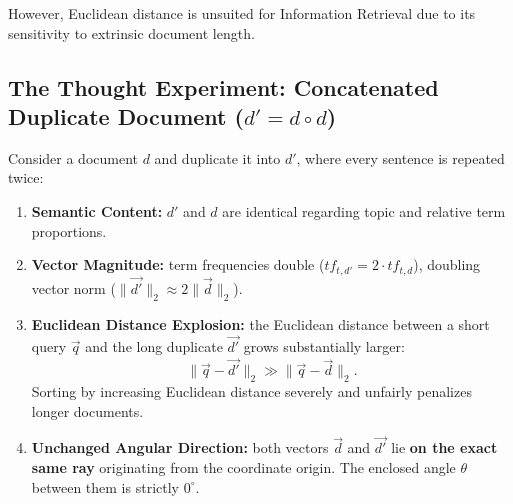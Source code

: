 However, Euclidean distance is unsuited for Information Retrieval due to its sensitivity to extrinsic document length.

\subsection[The Thought Experiment: Concatenated Duplicate Document]{The Thought Experiment: Concatenated Duplicate Document ($d' = d \circ d$)}
Consider a document $d$ and duplicate it into $d'$, where every sentence is repeated twice:
\begin{enumerate}
    \item \textbf{Semantic Content:} $d'$ and $d$ are identical regarding topic and relative term proportions.
    \item \textbf{Vector Magnitude:} term frequencies double ($tf_{t, d'} = 2 \cdot tf_{t, d}$), doubling vector norm ($\|\vec{d'}\|_2 \approx 2\|\vec{d}\|_2$).
    \item \textbf{Euclidean Distance Explosion:} the Euclidean distance between a short query $\vec{q}$ and the long duplicate $\vec{d'}$ grows substantially larger:
    \begin{equation}
    \|\vec{q} - \vec{d'}\|_2 \gg \|\vec{q} - \vec{d}\|_2.
    \end{equation}
    Sorting by increasing Euclidean distance severely and unfairly penalizes longer documents.
    \item \textbf{Unchanged Angular Direction:} both vectors $\vec{d}$ and $\vec{d'}$ lie \textbf{on the exact same ray} originating from the coordinate origin. The enclosed angle $\theta$ between them is strictly $0^\circ$.
\end{enumerate}

